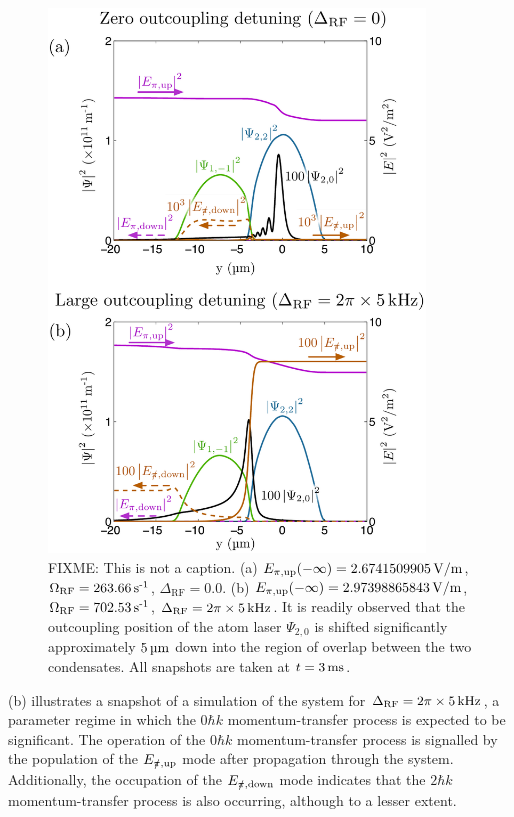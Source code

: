 \begin{figure}
    \centering
    \includegraphics[width=10cm]{3LevelParameterScanSnapshots}
    \caption{FIXME: This is not a caption. (a) $E_{\pi,\text{up}}(-\infty) = \unit[2.6741509905]{V/m}$, $\Omega_\text{RF} = \unit[263.66]{s\textsuperscript{-1}}$, $\Delta_\text{RF} = 0.0$. (b) $E_{\pi, \text{up}}(-\infty) = \unit[2.97398865843]{V/m}$, $\Omega_\text{RF} = \unit[702.53]{s\textsuperscript{-1}}$, $\Delta_\text{RF} = 2 \pi \times \unit[5]{kHz}$.  It is readily observed that the outcoupling position of the atom laser $\Psi_{2, 0}$ is shifted significantly approximately $\unit[5]{\micro m}$ down into the region of overlap between the two condensates. All snapshots are taken at $t = \unit[3]{ms}$.}
    \label{OpticalPumping:3LevelParameterScanSnapshots}
\end{figure}

(b) illustrates a snapshot of a simulation of the system for $\Delta_\text{RF} = 2\pi \times \unit[5]{kHz}$, a parameter regime in which the $0 \hbar k$ momentum-transfer process is expected to be significant.  The operation of the $0 \hbar k$ momentum-transfer process is signalled by the population of the $E_{\slashed{\pi}, \text{up}}$ mode after propagation through the system.  Additionally, the occupation of the $E_{\slashed{\pi}, \text{down}}$ mode indicates that the $2 \hbar k$ momentum-transfer process is also occurring, although to a lesser extent.  


